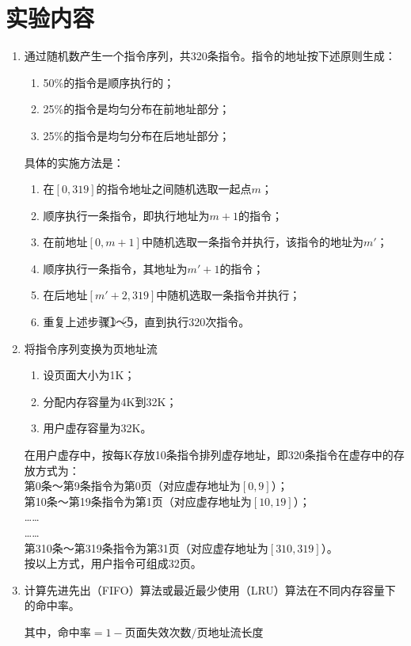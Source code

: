 \documentclass[c5size,a4paper,nofonts]{ctexart}
\begin{document}
\section{实验内容}
\begin{enumerate}[label={(\arabic*)}]
\item 通过随机数产生一个指令序列，共320条指令。指令的地址按下述原则生成：
\begin{enumerate}[label={\textcircled{\small\arabic*}}]
\item 50\%的指令是顺序执行的；
\item 25\%的指令是均匀分布在前地址部分；
\item 25\%的指令是均匀分布在后地址部分；
\end{enumerate}

具体的实施方法是：
\begin{enumerate}[label={\textcircled{\small\arabic*}}]
\item 在$[0,319]$的指令地址之间随机选取一起点$m$；
\item 顺序执行一条指令，即执行地址为$m+1$的指令；
\item 在前地址$[0,m+1]$中随机选取一条指令并执行，该指令的地址为$m'$；
\item 顺序执行一条指令，其地址为$m'+1$的指令；
\item 在后地址$[m'+2,319]$中随机选取一条指令并执行；
\item 重复上述步骤\textcircled{\small1}～\textcircled{\small5}，直到执行320次指令。
\end{enumerate}

\item 将指令序列变换为页地址流
\begin{enumerate}[label={\textcircled{\small\arabic*}}]
\item 设页面大小为1K；
\item 分配内存容量为4K到32K；
\item 用户虚存容量为32K。
\end{enumerate}

在用户虚存中，按每K存放10条指令排列虚存地址，即320条指令在虚存中的存放方式为：\\
第0条～第9条指令为第0页（对应虚存地址为$[0,9]$）；\\
第10条～第19条指令为第1页（对应虚存地址为$[10,19]$）；\\
……\\
……\\
第310条～第319条指令为第31页（对应虚存地址为$[310,319]$）。\\
按以上方式，用户指令可组成32页。
\item 计算先进先出（FIFO）算法或最近最少使用（LRU）算法在不同内存容量下的命中率。

其中，$\text{命中率}=1-\text{页面失效次数}/\text{页地址流长度}$
\end{enumerate}
\end{document}
